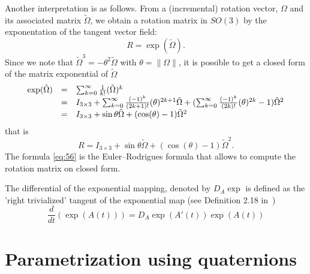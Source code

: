Another interpretation is as follows. From a (incremental) rotation vector, $\Omega$ and its associated matrix $\tilde \Omega$, we obtain a rotation matrix in $SO(3)$ by the exponentation of the tangent vector field:
\begin{equation}
  \label{eq:52}
  R = \exp(\tilde\Omega).
\end{equation}
Since we note that $\tilde \Omega^ 3 = - \theta^2 \tilde \Omega$ with $\theta = \|\Omega\|$, it is possible to get a closed form of the matrix exponential of $\tilde \Omega$
\begin{equation}
  \label{eq:55}
  \begin{array}[lcl]{lcl}
     \exp(\tilde \Omega) &=& \sum_{k=0}^{\infty} \frac {1}{k!} (\tilde \Omega)^k \\
                         &=&  I_{3\times 3} + \sum_{k=0}^{\infty} \frac {(-1)^k}{(2k+1)!} ( \theta)^{2k+1} \tilde \Omega + (\sum_{k=0}^{\infty} \frac {(-1)^k}{(2k)!} ( \theta)^{2k} -1)\tilde \Omega^2\\
                         &=&  I_{3\times 3} +\sin{\theta}\tilde \Omega +  (\cos(\theta)-1)\tilde \Omega^2 \\                   
  \end{array} 
\end{equation}
that is
\begin{equation}
  \label{eq:56}
  R = I_{3\times 3} +\sin{\theta}\tilde \Omega +  (\cos(\theta)-1)\tilde \Omega^2.
\end{equation}
The formula \eqref{eq:56} is the Euler--Rodrigues formula that allows to compute the rotation matrix on closed form.

The differential of the exponential mapping, denoted by $D_A\exp$ is defined as the 'right trivialized' tangent of the exponential map (see Definition 2.18 in~\cite{Iserles.ea_AN2000})
\begin{equation}
  \label{eq:57}
  \frac{d}{dt} (\exp(A(t))) = D_A\exp(A'(t)) \exp(A(t))
\end{equation}

\section{Parametrization using quaternions}


